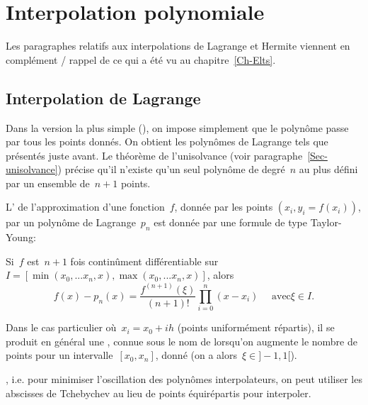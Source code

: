 \section{Interpolation polynomiale}

Les paragraphes relatifs aux interpolations de Lagrange et Hermite viennent en complément / rappel 
de ce qui a été vu au chapitre~\ref{Ch-Elts}.

\medskip
\subsection{Interpolation de Lagrange}

Dans la version la plus simple (), on impose simplement que le 
polynôme passe par tous les points donnés. 
On obtient les polynômes de Lagrange tels que présentés juste avant.
Le théorème de l'unisolvance (voir paragraphe~\ref{Sec-unisolvance}) précise qu'il n'existe qu'un seul 
polynôme de degré~$n$ au plus défini par un ensemble de~$n+1$ points.

\medskip
L' de l'approximation d'une fonction~$f$, donnée par les points 
$(x_i,y_i=f(x_i))$, par un polynôme de Lagrange~$p_n$ est donnée par une formule de type 
Taylor-Young:

Si~$f$ est~$n+1$ fois continûment différentiable sur~$I=[\min(x_0,...x_n,x),\max(x_0,...x_n,x)]$, alors
\begin{equation}
  f(x) - p_n(x) = \frac{f^{(n+1)}(\xi)}{(n+1)!} \prod_{i=0}^n (x-x_i) \quad \text{ avec} \xi \in I.
\end{equation}

\medskip
Dans le cas particulier où~$x_i = x_0 + ih$ (points uniformément répartis), il se produit en général 
une , connue sous le nom de 
lorsqu'on augmente le nombre de points pour un intervalle~$[x_0,x_n]$, donné (on a alors~$\xi\in]-1,1[$).

\medskip
{}, i.e. 
pour minimiser l'oscillation des polynômes interpolateurs, on peut utiliser les abscisses de 
Tchebychev au lieu de points 
équirépartis pour interpoler. 

